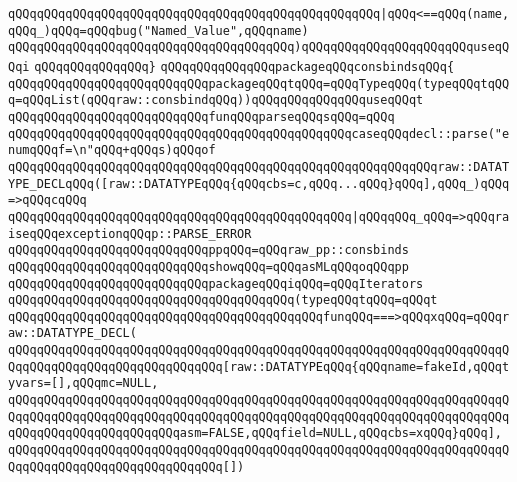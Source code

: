 \verb|qQQqqQQqqQQqqQQqqQQqqQQqqQQqqQQqqQQqqQQqqQQqqQQqqQQq|\verb#|qQQq<==qQQq(name,qQQq_)qQQq=qQQqbug("Named_Value",qQQqname)#\newline
\verb|qQQqqQQqqQQqqQQqqQQqqQQqqQQqqQQqqQQqqQQq)qQQqqQQqqQQqqQQqqQQqqQQquseqQQqi|\newline
\verb|qQQqqQQqqQQqqQQq}|\newline
\newline
\verb|qQQqqQQqqQQqqQQqpackageqQQqconsbindsqQQq{|\newline
\newline
\verb|qQQqqQQqqQQqqQQqqQQqqQQqqQQqpackageqQQqtqQQq=qQQqTypeqQQq(typeqQQqtqQQq=qQQqList(qQQqraw::consbindqQQq))qQQqqQQqqQQqqQQquseqQQqt|\newline
\verb|qQQqqQQqqQQqqQQqqQQqqQQqqQQqfunqQQqparseqQQqsqQQq=qQQq|\newline
\verb|qQQqqQQqqQQqqQQqqQQqqQQqqQQqqQQqqQQqqQQqqQQqqQQqcaseqQQqdecl::parse("enumqQQqf=\n"qQQq+qQQqs)qQQqof|\newline
\verb|qQQqqQQqqQQqqQQqqQQqqQQqqQQqqQQqqQQqqQQqqQQqqQQqqQQqqQQqqQQqraw::DATATYPE_DECLqQQq([raw::DATATYPEqQQq{qQQqcbs=c,qQQq...qQQq}qQQq],qQQq_)qQQq=>qQQqcqQQq|\newline
\verb|qQQqqQQqqQQqqQQqqQQqqQQqqQQqqQQqqQQqqQQqqQQqqQQq|\verb#|qQQqqQQq_qQQq=>qQQqraiseqQQqexceptionqQQqp::PARSE_ERROR#\newline
\verb|qQQqqQQqqQQqqQQqqQQqqQQqqQQqppqQQq=qQQqraw_pp::consbinds|\newline
\verb|qQQqqQQqqQQqqQQqqQQqqQQqqQQqshowqQQq=qQQqasMLqQQqoqQQqpp|\newline
\verb|qQQqqQQqqQQqqQQqqQQqqQQqqQQqpackageqQQqiqQQq=qQQqIterators|\newline
\verb|qQQqqQQqqQQqqQQqqQQqqQQqqQQqqQQqqQQqqQQq(typeqQQqtqQQq=qQQqt|\newline
\verb|qQQqqQQqqQQqqQQqqQQqqQQqqQQqqQQqqQQqqQQqqQQqfunqQQq===>qQQqxqQQq=qQQqraw::DATATYPE_DECL(|\newline
\verb|qQQqqQQqqQQqqQQqqQQqqQQqqQQqqQQqqQQqqQQqqQQqqQQqqQQqqQQqqQQqqQQqqQQqqQQqqQQqqQQqqQQqqQQqqQQqqQQqqQQq[raw::DATATYPEqQQq{qQQqname=fakeId,qQQqtyvars=[],qQQqmc=NULL,|\newline
\verb|qQQqqQQqqQQqqQQqqQQqqQQqqQQqqQQqqQQqqQQqqQQqqQQqqQQqqQQqqQQqqQQqqQQqqQQqqQQqqQQqqQQqqQQqqQQqqQQqqQQqqQQqqQQqqQQqqQQqqQQqqQQqqQQqqQQqqQQqqQQqqQQqqQQqqQQqqQQqqQQqqQQqasm=FALSE,qQQqfield=NULL,qQQqcbs=xqQQq}qQQq],|\newline
\newline
\verb|qQQqqQQqqQQqqQQqqQQqqQQqqQQqqQQqqQQqqQQqqQQqqQQqqQQqqQQqqQQqqQQqqQQqqQQqqQQqqQQqqQQqqQQqqQQqqQQqqQQq[])|\newline

